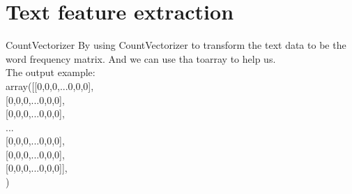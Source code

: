\documentclass[
 size=12pt,
 paper=smartboard, %
 mode=present, %
 display=slides, %
style=tuliplab,
pauseslide,
fleqn,leqno]{powerdot}
\begin{document}

\section{Text feature extraction}

\begin{slide}{ CountVectorizer}
By using  CountVectorizer to transform the text data to be the word frequency matrix. And we can use tha toarray to help us.\\
\vspace{1cm}
The output example:\\
\vspace{1cm}
\hspace{5cm}array([[0,0,0,...0,0,0],\\\hspace{6.25cm}[0,0,0,...0,0,0],\\\hspace{6.25cm}[0,0,0,...0,0,0],\\\hspace{6.25cm}...\\\hspace{6.25cm}[0,0,0,...0,0,0],\\\hspace{6.25cm}[0,0,0,...0,0,0],\\\hspace{6.25cm}[0,0,0,...0,0,0]],\\\hspace{6.05cm})
\end{slide}
\end{document}
